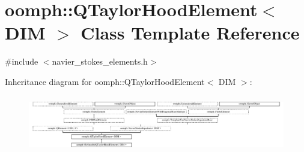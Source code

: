 \hypertarget{classoomph_1_1QTaylorHoodElement}{}\section{oomph\+:\+:Q\+Taylor\+Hood\+Element$<$ D\+IM $>$ Class Template Reference}
\label{classoomph_1_1QTaylorHoodElement}


{\ttfamily \#include $<$navier\+\_\+stokes\+\_\+elements.\+h$>$}

Inheritance diagram for oomph\+:\+:Q\+Taylor\+Hood\+Element$<$ D\+IM $>$\+:\begin{figure}[H]
\begin{center}
\leavevmode
\includegraphics[height=2.507463cm]{classoomph_1_1QTaylorHoodElement}
\end{center}
\end{figure}
